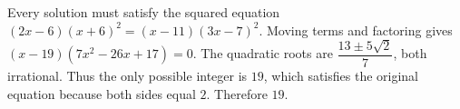 Every solution must satisfy the squared equation $(2x-6)(x+6)^2=(x-11)(3x-7)^2$. Moving terms and factoring gives $(x-19)(7x^2-26x+17)=0$. The quadratic roots are $\dfrac{13\pm5\sqrt2}{7}$, both irrational. Thus the only possible integer is $19$, which satisfies the original equation because both sides equal $2$. Therefore $\boxed{19}$.
